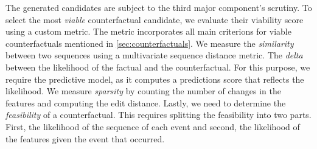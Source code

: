 \documentclass[./../../paper.tex]{subfiles}
\begin{document}
The generated candidates are subject to the third major component's scrutiny. 
To select the most \emph{viable} counterfactual candidate, we evaluate their viability score using a custom metric. 
The metric incorporates all main criterions for viable counterfactuals mentioned in \autoref{sec:counterfactuals}. 
We measure the \emph{similarity} between two sequences using a multivariate sequence distance metric. The \emph{delta} between the likelihood of the factual and the counterfactual. For this purpose, we require the predictive model, as it computes a predictions score that reflects the likelihood. 
We measure \emph{sparsity} by counting the number of changes in the features and computing the edit distance. Lastly, we need to determine the \emph{feasibility} of a counterfactual. This requires splitting the feasibility into two parts. First, the likelihood of the sequence of each event and second, the likelihood of the features given the event that occurred.
\end{document}
